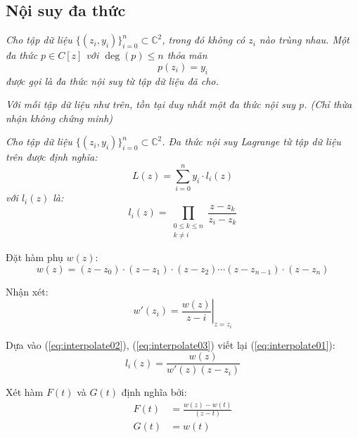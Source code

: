 \subsection{Nội suy đa thức}
	\theoremstyle{definition}
	\begin{definition}
		\textit{
			Cho tập dữ liệu \(\{(z_i, y_i)\}_{i=0}^n \subset \mathbb C^2\), trong đó không có \(z_i\) nào trùng nhau. Một đa thức \(p \in C[z]\) với \(\deg(p) \le n\) thỏa mãn
			\[p(z_i) = y_i\]
			được gọi là đa thức nội suy từ tập dữ liệu đã cho.
		}
	\end{definition}

	\begin{theorem}
		\textit{Với mỗi tập dữ liệu như trên, tồn tại duy nhất một đa thức nội suy \(p\). (Chỉ thừa nhận không chứng minh)}
	\end{theorem}

	\begin{definition}
		\textit{Cho tập dữ liệu \({\{(z_i, y_i)\}_{i=0}^n \subset \mathbb{C}^2}\). Đa thức nội suy Lagrange từ tập dữ liệu trên được định nghĩa:
		\begin{equation}
			\label{eq:interpolate00}
			L(z) = \sum_{i=0}^n y_i\cdot l_i(z)
		\end{equation}
		với \(l_i(z)\) là:
		\begin{equation}
			\label{eq:interpolate01}
			l_i(z) = \prod_{\substack{0\le k \le n\\k\ne i}} \frac{z-z_k}{z_i-z_k}
		\end{equation}
		}
	\end{definition}

	Đặt hàm phụ \(w(z)\):
	\begin{equation}
		\label{eq:interpolate02}
		w(z) = (z-z_0)\cdot(z-z_1)\cdot(z-z_2)\cdots(z-z_{n-1})\cdot(z-z_n)
	\end{equation}

	Nhận xét:
	\begin{equation}
		\label{eq:interpolate03}
		w'(z_i) = \left.\frac{w(z)}{z-i}\right\vert_{z=z_i}
	\end{equation}


	Dựa vào (\ref{eq:interpolate02}), (\ref{eq:interpolate03}) viết lại (\ref{eq:interpolate01}):
	\begin{equation}
		\label{eq:interpolate04}
		l_i(z) = \frac{w(z)}{w'(z)(z-z_i)}
	\end{equation}

	Xét hàm \(F(t)\) và \(G(t)\) định nghĩa bởi:
	\begin{align}
		\label{eq:interpolate05}
		F(t) &= \frac{w(z)-w(t)}{(z-t)}\\
		\label{eq:interpolate06}
		G(t) &= w(t)
	\end{align}

